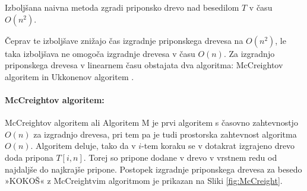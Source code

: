 \begin{izr}\label{izr:naivnaIzbolsana}
    Izboljšana naivna metoda zgradi priponsko drevo nad besedilom $T$ v času $O(n^2)$.
\end{izr}

%

Čeprav te izboljšave znižajo čas izgradnje priponskega drevesa na $O(n^2)$, le taka izboljšava ne omogoča izgradnje drevesa v času $O(n)$. Za izgradnjo priponskega drevesa v linearnem času obstajata dva algoritma: McCreightov algoritem \cite{McCreight1976} in Ukkonenov algoritem \cite{Ukkonen1995}. 

\paragraph{McCreightov algoritem:}
McCreightov algoritem ali Algoritem M je prvi algoritem s časovno zahtevnostjo $O(n)$ za izgradnjo drevesa, pri tem pa je tudi prostorska zahtevnost algoritma $O(n)$.
Algoritem deluje, tako da v $i$-tem koraku se v dotakrat izgrajeno drevo doda pripona $T[i,n]$. Torej so pripone dodane v drevo v vrstnem redu od najdaljše do najkrajše pripone. Postopek izgradnje priponskega drevesa za besedo »KOKOŠ« z McCreightvim algoritmom je prikazan na Sliki \ref{fig:McCreight}.

